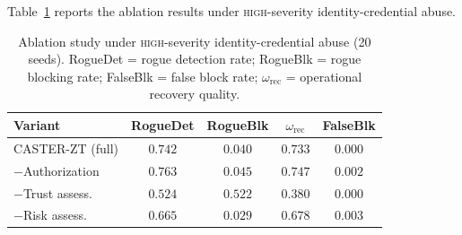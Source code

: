 \documentclass[10pt,journal,compsoc]{IEEEtran}
\begin{document}
Table~\ref{tab:ablation} reports the ablation results under \textsc{high}-severity identity-credential abuse.

\begin{table}[t]
\centering
\caption{Ablation study under \textsc{high}-severity identity-credential abuse (20 seeds).  RogueDet = rogue detection rate; RogueBlk = rogue blocking rate; FalseBlk = false block rate; $\omega_{\mathrm{rec}}$ = operational recovery quality.}
\label{tab:ablation}
\begin{tabular}{lcccc}
\toprule
Variant & RogueDet & RogueBlk & $\omega_{\mathrm{rec}}$ & FalseBlk \\
\midrule
CASTER-ZT (full)  & $\mathbf{0.742}$ & $\mathbf{0.040}$ & $\mathbf{0.733}$ & $\mathbf{0.000}$ \\
$-$Authorization  & $0.763$          & $0.045$          & $0.747$          & $0.002$ \\
$-$Trust assess.  & $0.524$          & $0.522$          & $0.380$          & $0.000$ \\
$-$Risk assess.   & $0.665$          & $0.029$          & $0.678$          & $0.003$ \\
\bottomrule
\end{tabular}
\end{table}
\end{document}
